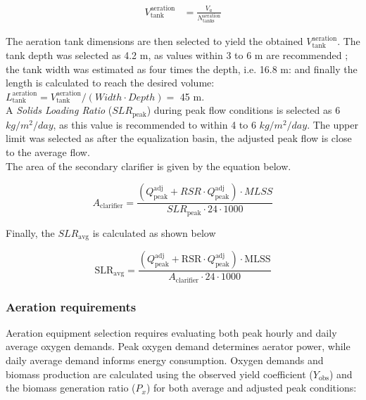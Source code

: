 \documentclass[11pt]{article}
\begin{document}
\begin{align}
  V_{\text{tank}}^{\text{aeration}} &=\frac{V_a}{N_{\text{tanks}}^{\text{aeration}}} \label{eq:volume_aeration_tank}
\end{align}

The aeration tank dimensions are then selected to yield the obtained $V_{\text{tank}}^{\text{aeration}}$.
The tank depth was selected as 
4.2
m, as values within 3 to 6 m are recommended 
\cite{metcalf_2014_wastewater}; 
the tank width was estimated as 
four times the depth, i.e. 
16.8
m: and finally the length is calculated to reach the desired 
volume: $L_{\text{tank}}^{\text{aeration}}=V_{\text{tank}}^{\text{aeration}}/(Width \cdot Depth)= $
45
m. \\
A \textit{Solids Loading Ratio} ($SLR_{\text{peak}}$) 
during peak flow conditions is selected as 
6
$kg/m^2/day$, as this value is recommended to within 
4 to 6 $kg/m^2/day$. The upper limit was selected as 
after the equalization basin, the adjusted peak flow is 
close to the average flow.\\

The area of the secondary clarifier is given by the equation below.

\begin{equation}
A_{\text{clarifier}} = \frac{(Q_{\text{peak}}^{\text{adj}} + RSR \cdot Q_{\text{peak}}^{\text{adj}}) \cdot MLSS}{SLR_{\text{peak}} \cdot 24 \cdot 1000}
\label{eq:secondary_clarifier_area}
\end{equation}

Finally, the $SLR_{\text{avg}}$ is calculated as shown below

\begin{equation}
\text{SLR}_{\text{avg}} = \frac{\left(Q_{\text{peak}}^{\text{adj}} + \text{RSR} \cdot Q_{\text{peak}}^{\text{adj}}\right) \cdot \text{MLSS}}{A_{\text{clarifier}} \cdot 24 \cdot 1000}
\label{eq:solids_loading_average}
\end{equation}

\subsubsection{Aeration requirements}
\label{sec:aeration_requirements}

Aeration equipment selection requires evaluating 
both peak hourly and daily average oxygen demands. 
Peak oxygen demand determines aerator power, while 
daily average demand informs energy consumption. 
Oxygen demands and biomass production are 
calculated using the observed yield coefficient ($Y_{\text{obs}}$) 
and the biomass generation ratio ($P_x$) for both average and 
adjusted peak conditions:
\end{document}
